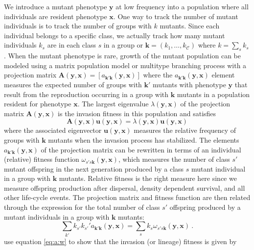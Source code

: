 \documentclass[11pt]{article}
\renewcommand{\vec}[1]{\symbf{#1}}
\newcommand{\eig}{\lambda}
\newcommand{\numc}{\mathcal{C}}
\begin{document}
We introduce a mutant phenotype $\vec{y}$ at low frequency into a population where all individuals are resident phenotype $\vec{x}$. One way to track the number of mutant individuals is to track the number of groups with $k$ mutants. Since each individual belongs to a specific class, we actually track how many mutant individuals $k_{s}$ are in each class $s$ in a group or $\vec{k} = (k_{1},\ldots,k_{\numc})$ where $k = \sum_{s} k_{s}$. When the mutant phenotype is rare, growth of the mutant population can be modeled using a matrix population model \cite{Caswell:2006} or multitype branching process \cite{Kimmel:Axelrod:2015} with a projection matrix $\vec{A}(\vec{y}, \vec{x}) = [a_{\vec{k}'\vec{k}}(\vec{y}, \vec{x})]$ where the $a_{\vec{k}'\vec{k}}(\vec{y}, \vec{x})$ element measures the expected number of groups with $\vec{k}'$ mutants with phenotype $\vec{y}$ that result from the reproduction occurring in a group with $\vec{k}$ mutants in a population resident for phenotype $\vec{x}$. The largest eigenvalue $\eig(\vec{y}, \vec{x})$ of the projection matrix $\vec{A}(\vec{y}, \vec{x})$ is the invasion fitness in this population and satisfies
\begin{equation}
  \label{eq:Au:eigu}
  \vec{A}(\vec{y}, \vec{x}) \vec{u}(\vec{y}, \vec{x}) = \eig(\vec{y}, \vec{x}) \vec{u}(\vec{y}, \vec{x})
\end{equation}
where the associated eigenvector $\vec{u}(\vec{y}, \vec{x})$ measures the relative frequency of groups with $\vec{k}$ mutants when the invasion process has stabilized. The elements $a_{\vec{k}'\vec{k}}(\vec{y}, \vec{x})$ of the projection matrix can be rewritten in terms of an individual (relative) fitness function $\omega_{s's\vec{k}}(\vec{y}, \vec{x})$, which measures the number of class $s'$ mutant offspring in the next generation produced by a class $s$ mutant individual in a group with $\vec{k}$ mutants. Relative fitness is the right measure here since we measure offspring production after dispersal, density dependent survival, and all other life-cycle events. The projection matrix and fitness function are then related through the expression for the total number of class $s'$ offspring produced by a mutant individuals in a group with $\vec{k}$ mutants:
\begin{equation}
  \label{eq:a:w}
  \sum_{k'} k_{s'} k_{s'}' a_{\vec{k}'\vec{k}}(\vec{y}, \vec{x}) = \sum_{s} k_{s} \omega_{s's\vec{k}}(\vec{y}, \vec{x}) \: .
\end{equation}
\citeauthor{Lehmann:Mullon:2016} \cite{Lehmann:Mullon:2016,Lehmann:Rousset:2020} use equation \eqref{eq:a:w} to show that the invasion (or lineage) fitness is given by
\end{document}
